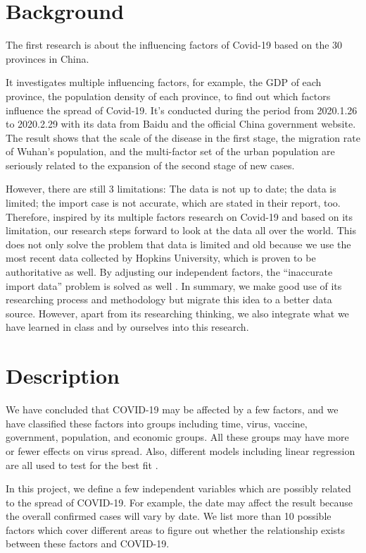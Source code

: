 \documentclass{article}
\begin{document}
\begin{multicols}{2}
\section{Background}
The first research is about the influencing factors of Covid-19 based on the 30 provinces in China.

It investigates multiple influencing factors, for example, the GDP of each province, the population density of each province, to find out which factors influence the spread of Covid-19. It’s conducted during the period from 2020.1.26 to 2020.2.29 with its data from Baidu and the official China government website. The result shows that the scale of the disease in the first stage, the migration rate of Wuhan’s population, and the multi-factor set of the urban population are seriously related to the expansion of the second stage of new cases.

However, there are still 3 limitations: The data is not up to date; the data is limited; the import case is not accurate, which are stated in their report, too. Therefore, inspired by its multiple factors research on Covid-19 and based on its limitation, our research steps forward to look at the data all over the world. This does not only solve the problem that data is limited and old because we use the most recent data collected by Hopkins University, which is proven to be authoritative as well. By adjusting our independent factors, the “inaccurate import data” problem is solved as well \cite{williamson2020opensafely}. In summary, we make good use of its researching process and methodology but migrate this idea to a better data source. However, apart from its researching thinking, we also integrate what we have learned in class and by ourselves into this research.

\section{Description}
We have concluded that COVID-19 may be affected by a few factors, and we have classified these factors into groups including time, virus, vaccine, government, population, and economic groups. All these groups may have more or fewer effects on virus spread. Also, different models including linear regression are all used to test for the best fit \cite{al2020optimization}. 

In this project, we define a few independent variables which are possibly related to the spread of COVID-19. For example, the date may affect the result because the overall confirmed cases will vary by date. We list more than 10 possible factors which cover different areas to figure out whether the relationship exists between these factors and COVID-19\cite{fauci2020covid,jordan2020covid}.


\end{multicols}
\end{document}
